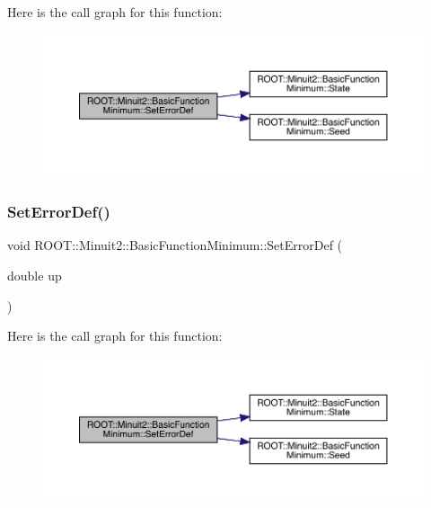 Here is the call graph for this function\+:
\nopagebreak
\begin{figure}[H]
\begin{center}
\leavevmode
\includegraphics[width=350pt]{de/d25/classROOT_1_1Minuit2_1_1BasicFunctionMinimum_ae89163fbfaccda743a6ca8d3add896dc_cgraph}
\end{center}
\end{figure}
\mbox{\label{classROOT_1_1Minuit2_1_1BasicFunctionMinimum_ae89163fbfaccda743a6ca8d3add896dc}} 
\subsubsection{\texorpdfstring{SetErrorDef()}{SetErrorDef()}\hspace{0.1cm}{\footnotesize\ttfamily [2/2]}}
{\footnotesize\ttfamily void R\+O\+O\+T\+::\+Minuit2\+::\+Basic\+Function\+Minimum\+::\+Set\+Error\+Def (\begin{DoxyParamCaption}\item[{double}]{up }\end{DoxyParamCaption})\hspace{0.3cm}{\ttfamily [inline]}}

Here is the call graph for this function\+:
\nopagebreak
\begin{figure}[H]
\begin{center}
\leavevmode
\includegraphics[width=350pt]{de/d25/classROOT_1_1Minuit2_1_1BasicFunctionMinimum_ae89163fbfaccda743a6ca8d3add896dc_cgraph}
\end{center}
\end{figure}
\mbox{\label{classROOT_1_1Minuit2_1_1BasicFunctionMinimum_a57c7f1a6d3551fd329698e0fc9424fec}} 
